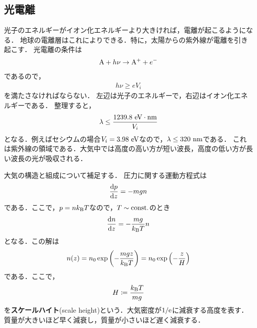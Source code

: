 \documentclass{report}
\begin{document}
    \subsection{光電離}
      光子のエネルギーがイオン化エネルギーより大きければ，電離が起こるようになる．
      地球の電離層はこれによりできる．特に，太陽からの紫外線が電離を引き起こす．
      光電離の条件は
      \begin{align}
        \ce{A} + h\nu \rightarrow \ce{A}^+ + e^-
      \end{align}
      であるので，
      \begin{align}
        h\nu \geq e V_i
      \end{align}
      を満たさなければならない．
      左辺は光子のエネルギーで，右辺はイオン化エネルギーである．
      整理すると，
      \begin{align}
        \lambda \leq \frac{1239.8\ \mathrm{eV \cdot nm}}{V_i}
      \end{align}
      となる．例えばセシウムの場合$V_i = 3.98\ \mathrm{eV}$なので，$\lambda \leq 320\ \mathrm{nm}$である．
      これは紫外線の領域である．大気中では高度の高い方が短い波長，高度の低い方が長い波長の光が吸収される．
      \par
      大気の構造と組成について補足する．
      圧力に関する運動方程式は
      \begin{align}
        \dv{p}{z} = -mgn
      \end{align}
      である．ここで，$p = nk_{\mathrm{B}} T$なので，$T \sim \mathrm{const.}$のとき
      \begin{align}
        \dv{n}{z} = -\frac{mg}{k_{\mathrm{B}} T}n
      \end{align}
      となる．この解は
      \begin{align}
        n(z) = n_0 \exp\qty(-\frac{mgz}{k_{\mathrm{B}} T}) = n_0 \exp\qty(-\frac{z}{H})
      \end{align}
      である．ここで，
      \begin{align}
        H \coloneqq \frac{k_{\mathrm{B}} T}{mg}
      \end{align}
      を\textbf{スケールハイト}(scale height)という．大気密度が$1/\mathrm{e}$に減衰する高度を表す．
      質量が大きいほど早く減衰し，質量が小さいほど遅く減衰する．
\end{document}
